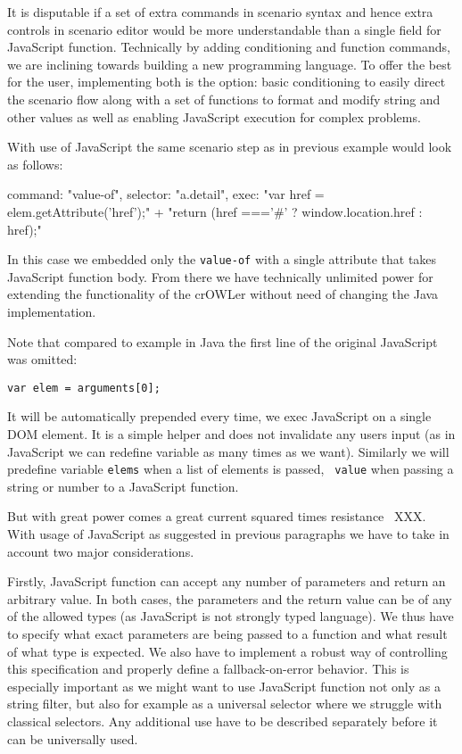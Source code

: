 It is disputable if a set of extra commands in scenario syntax and hence extra
controls in scenario editor would be more understandable than a single field
for JavaScript function. Technically by adding conditioning and function
commands, we are inclining towards building a new programming language. To
offer the best for the user, implementing both is the option: basic
conditioning to easily direct the scenario flow along with a set of functions
to format and modify string and other values as well as enabling JavaScript
execution for complex problems. 

With use of JavaScript the same scenario step as in previous example would look
as follows: 

\begtt
{
  command: "value-of", 
  selector: "a.detail", 
  exec: "var href = elem.getAttribute('href');" +
        "return (href ==='#' ? window.location.href : href);"
}
\endtt

In this case we embedded only the {\tt value-of} with a single attribute that
takes JavaScript function body. From there we have technically unlimited power
for extending the functionality of the crOWLer without need of changing the
Java implementation. 

Note that compared to example in Java the first line of the original JavaScript
was omitted: 

{\tt var elem = arguments[0];} 

It will be automatically prepended every time, we exec JavaScript on a single
DOM element. It is a simple helper and does not invalidate any users input (as
in JavaScript we can redefine variable as many times as we want). Similarly we
will predefine variable {\tt elems} when a list of elements is passed, {\tt
value} when passing a string or number to a JavaScript function. 

But with great power comes a great current squared times
resistance~ XXX. With usage of JavaScript as
suggested in previous paragraphs we have to take in account two major
considerations. 

Firstly, JavaScript function can accept any number of parameters and return an
arbitrary value. In both cases, the parameters and the return value can be
of any of the allowed types (as JavaScript is not strongly typed language). We
thus have to specify what exact parameters are being passed to a function and
what result of what type is expected. We also have to implement a robust way of
controlling this specification and properly define a fallback-on-error
behavior. This is especially important as we might want to use JavaScript
function not only as a string filter, but also for example as a universal
selector where we struggle with classical selectors. Any additional use have
to be described separately before it can be universally used. 

